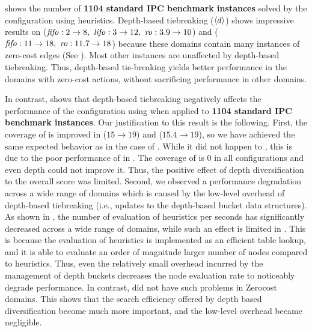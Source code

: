  shows the number of \textbf{1104 standard IPC benchmark instances} solved by the configuration using \lmcut
heuristics. Depth-based tiebreaking (${\left<d\right>}$) shows impressive results on  ($\fifo:2\to 8,\ \lifo:3\to 12,\  \ro:3.9\to 10$) and  (${\text{\textit{fifo}}}: 11\to 18,\ {\text{\textit{ro}}}: 11.7\to 18$) because these
domains contain many instances of zero-cost edges (See
).  Most other instances are unaffected by depth-based tiebreaking.  Thus, depth-based
tie-breaking yields better performance in the domains with zero-cost actions, without sacrificing performance in
other domains.

In contrast,  shows that depth-based tiebreaking negatively affects the performance of
the configuration using \mands when applied to \textbf{1104 standard IPC benchmark instances}. Our justification to this result is
the following.
% 
First, the coverage of  is improved in \fifo ($15\to 19$) and \ro ($15.4\to 19$), so we have achieved the same expected behavior as in the case of \lmcut.
%
While it did not happen to , this is due to the poor performance of \mands in .
The coverage of  is 0 in all configurations and even depth could not improve it. Thus, the positive
effect of depth diversification to the overall score was limited.
% 
Second, we observed a performance degradation across a wide range of domains which is caused by the low-level overhead of depth-based tiebreaking (i.e., updates to the depth-based bucket data structures).
As shown in , the number of evaluation of \mands heuristics per seconds has significantly decreased across a wide range of domains, while such an effect is limited in \lmcut.
This is because the evaluation of \mands heuristics is implemented
as an efficient table lookup, and it is able to evaluate an order of magnitude larger number of nodes compared to \lmcut heuristics.
Thus, even the relatively small overhead incurred by the management of depth buckets decreases the node evaluation rate to noticeably degrade performance.
In contrast, \mands did not have such problems in Zerocost domains. This shows that the search efficiency offered by depth based diversification become much more important,
and the low-level overhead became negligible.


